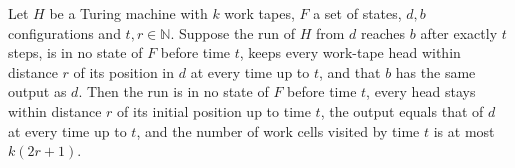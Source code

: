 \begin{lemma}
\label{Turing.cw_finish}
\leanok
{}
Let $H$ be a Turing machine with $k$ work tapes, $F$ a set of states, $d,b$ configurations and
$t,r\in\mathbb{N}$. Suppose the run of $H$ from $d$ reaches $b$ after exactly $t$ steps, is in
no state of $F$ before time $t$, keeps every work-tape head within distance $r$ of its position
in $d$ at every time up to $t$, and that $b$ has the same output as $d$. Then the run is in no
state of $F$ before time $t$, every head stays within distance $r$ of its initial position up
to time $t$, the output equals that of $d$ at every time up to $t$, and the number of work
cells visited by time $t$ is at most $k(2r+1)$.
\end{lemma}

